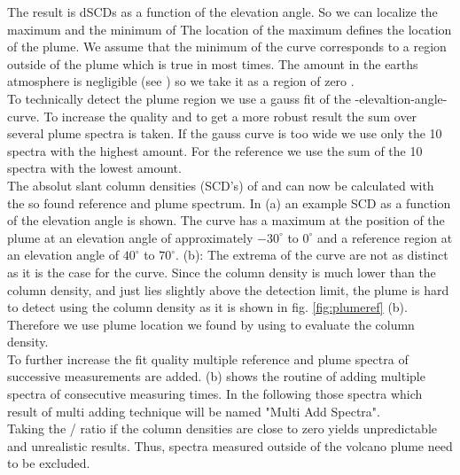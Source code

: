 The result is  dSCDs as a function of the elevation angle. So we can localize the maximum and the minimum of 
The location of the  maximum defines the location of the plume. We assume that the minimum of the  curve corresponds to a region outside of the plume which is true in most times. The  amount in the earths atmosphere is negligible (see  ) so we take it as a region of zero . \\
To technically detect the plume region we use a gauss fit of the -elevaltion-angle-curve.
To increase the quality and to get a more robust result the sum over several plume spectra is taken. If the gauss curve is too wide we use only the 10 spectra with the highest  amount. For the reference we use the sum of the 10 spectra with the lowest  amount.\\
%
The absolut slant column densities (SCD's) of   and  can now be calculated with the so found reference and plume spectrum.
In  (a) an example  SCD as a function of the elevation angle is shown. The  curve has a maximum at the position of the plume at an elevation angle of approximately $-30^{\circ}$ to $0^{\circ}$  and a reference region at an elevation angle of $40^{\circ}$ to $70^{\circ}$.  (b): The extrema of the   curve are not as distinct as it is the case for the  curve.
Since the  column density is much lower than the  column density, and just lies slightly above the detection limit, the plume is hard to detect using the  column density as it is shown in fig. \ref{fig:plumeref} (b). 
Therefore we use plume location we found by using  to evaluate the  column density.\\
To further increase the fit quality multiple reference and plume spectra of successive measurements are added.
 (b) shows the routine of adding multiple spectra of consecutive measuring times. In the following those spectra which result of multi adding technique will be named "Multi Add Spectra".\\
%
Taking the / ratio if the column densities are close to zero yields unpredictable and unrealistic results. Thus, spectra measured outside of the volcano plume need to be excluded.
